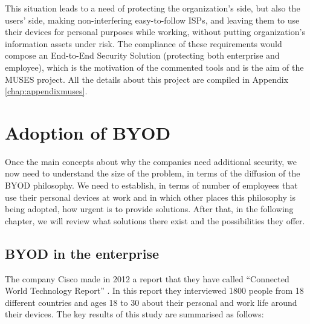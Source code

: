 This situation leads to a need of protecting the organization's side, but also the users' side, making non-interfering easy-to-follow ISPs, and leaving them to use their devices for personal purposes while working, without putting organization's information assets under risk. The compliance of these requirements would compose an End-to-End Security Solution (protecting both enterprise and employee), which is the motivation of the commented tools and is the aim of the MUSES project. All the details about this project are compiled in Appendix \ref{chap:appendixmuses}.

\section{Adoption of BYOD}
\label{sec:byodadoption}

Once the main concepts about why the companies need additional security, we now need to understand the size of the problem, in terms of the diffusion of the BYOD philosophy. We need to establish, in terms of number of employees that use their personal devices at work and in which other places this philosophy is being adopted, how urgent is to provide solutions. After that, in the following chapter, we will review what solutions there exist and the possibilities they offer.

\subsection{BYOD in the enterprise}
\label{subsec:byodcompany}

The company Cisco made in 2012 a report that they have called ``Connected World Technology Report'' \cite{cisco2012}. In this report they interviewed 1800 people from 18 different countries and ages 18 to 30 about their personal and work life around their devices. The key results of this study are summarised as follows:

